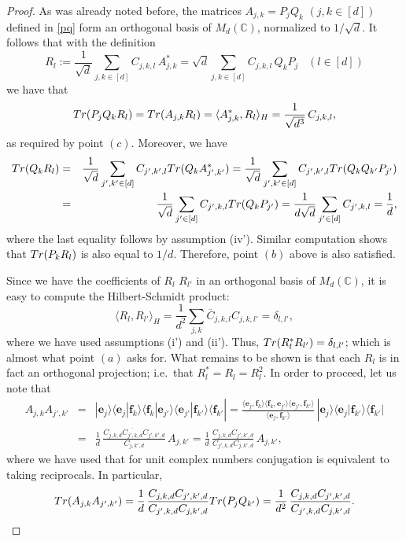 \documentclass[10pt,a4paper]{amsart}
\newcommand{\CC}{\ensuremath{\mathbb{C}}}
\newcommand{\eb}{\ensuremath{\mathbf{e}}}
\newcommand{\fb}{\ensuremath{\mathbf{f}}}
\begin{document}
\begin{proof}
As was already noted before, the matrices $A_{j,k}=P_jQ_k$ $(j,k\in [d])$ defined in \eqref{pq} form an orthogonal basis of $M_d(\CC)$, normalized to $1/\sqrt{d}$. It follows that with the definition
$$
R_l:=\frac{1}{\sqrt{d}}\sum_{j,k \in [d]}C_{j,k,l}\, A_{j,k}^* ={\sqrt{d}} \sum_{j,k\in [d]}C_{j,k,l}\, Q_kP_j\;\;\;
(l\in[d])
$$
we have that
$${\rm Tr}(P_j Q_kR_l)= 
{\rm Tr}(A_{j,k}R_l)=
\langle A_{j,k}^*,R_l\rangle_{H} = \frac{1}{\sqrt{d^3}} \, C_{j,k,l},$$
as required by point $(c)$. Moreover, we have 
\begin{eqnarray}
\nonumber
{\rm Tr}(Q_k R_l) &=& \frac{1}{\sqrt{d}}
\sum_{j',k'\in [d]}
 C_{j',k',l}
{\rm Tr}(Q_k A^*_{j',k'})=
\frac{1}{\sqrt{d}}
\sum_{j',k'\in [d]}
 C_{j',k',l}
{\rm Tr}(Q_k Q_{k'}P_{j'})
\\
\nonumber
&=&
\frac{1}{\sqrt{d}}
\sum_{j'\in [d]}
C_{j',k,l}
{\rm Tr}(Q_k P_{j'}) =
\frac{1}{d\sqrt{d}}
\sum_{j'\in [d]}
C_{j',k,l} =\frac{1}{d},
\end{eqnarray}
where the last equality follows by assumption (iv'). Similar computation shows that 
${\rm Tr}(P_k R_l)$ is also equal to $1/d$. Therefore,  point $(b)$ above is also satisfied.

\medskip

Since we have the coefficients of $R_l$ $R_{l'}$ in an orthogonal basis of $M_d(\CC)$, it is easy 
to compute the Hilbert-Schmidt product:
$$
\langle R_l,R_{l'}\rangle_{H}=
\frac{1}{d^2}\sum_{j,k} 
\overline{C}_{j,k,l} C_{j,k,l'} =
\delta_{l,l'},
$$
where we have used assumptions (i') and (ii'). Thus, ${\rm Tr}(R_l^*R_{l'})=\delta_{l,l'}$; which is almost what point $(a)$
asks for. What remains to be shown is that each $R_l$ is in fact an orthogonal projection; i.e.\ that
$R_l^* = R_l=R_l^2$. In order to proceed, let us note that
\begin{eqnarray}
\nonumber
A_{j,k}A_{j',k'} &=& 
|\eb_j\rangle\langle \eb_j|
\fb_k\rangle\langle \fb_k|
\eb_{j'}\rangle\langle \eb_{j'}|
\fb_{k'}\rangle\langle \fb_{k'}| 
=
\frac{\langle \eb_j,
\fb_k\rangle\langle \fb_k,
\eb_{j'}\rangle\langle \eb_{j'},
\fb_{k'}\rangle}{\langle \eb_j,\fb_{k'}\rangle}
\,
|\eb_j\rangle\langle \eb_{j}
|\fb_{k'}\rangle\langle \fb_{k'}|
\\
\nonumber
&=&
\frac{1}{d}\,
\frac{C_{j,k,d} \overline{C_{j',k,d}} C_{j',k',d}}{ C_{j,k',d}}
\,
A_{j,k'}
=
\frac{1}{d}\,
\frac{C_{j,k,d} C_{j',k',d}}{ 
C_{j',k,d}
C_{j,k',d}}
\,
A_{j,k'},
\end{eqnarray}
where we have used that for unit complex numbers conjugation is equivalent to taking reciprocals.
In particular, 
\begin{equation}
\label{eq:TrAA}
{\rm Tr}(A_{j,k}A_{j',k'})=
\frac{1}{d}\,
\frac{C_{j,k,d} C_{j',k',d}}{ 
C_{j',k,d}
C_{j,k',d}}
{\rm Tr}(P_jQ_{k'}) =
\frac{1}{d^2}\,\frac{C_{j,k,d} C_{j',k',d}}{ 
C_{j',k,d}
C_{j,k',d}}.
\end{equation}


\end{proof}
\end{document}
